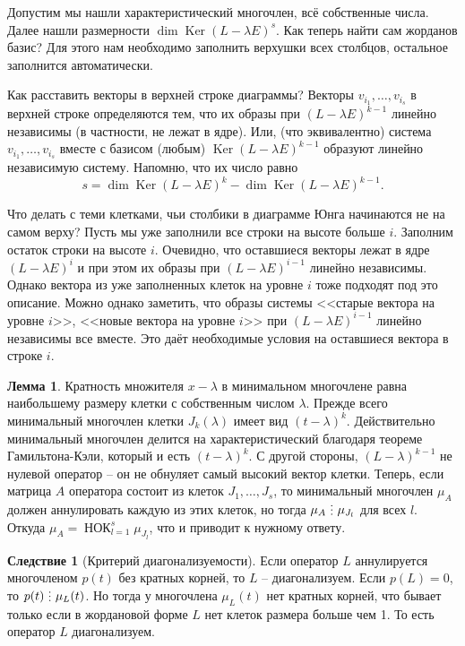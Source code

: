 \documentclass[10pt,a4paper,oneside]{book}
\theoremstyle{definition}
\newtheorem{lem}{Лемма}
\newtheorem{cor}{Следствие}
\DeclareMathOperator{\Ker}{Ker}
\newcommand{\di}{\mathop{\,\scalebox{0.85}{\raisebox{-1.2pt}[0.5\height]{\vdots}}\,}}
\newcommand{\Nok}{\operatorname{\text{НОК}}}
\def\lm{\begin{lem}}
\def\elm{\end{lem}}
\def\crl{\begin{cor}}
\def\ecrl{\end{cor}}
\begin{document}
\endproof








Допустим мы нашли характеристический многочлен, всё собственные числа. Далее нашли размерности $\dim \Ker(L-\lambda E)^s$. Как теперь найти сам жорданов базис? Для этого нам необходимо заполнить верхушки всех столбцов, остальное заполнится автоматически.



Как расставить векторы в верхней строке диаграммы? Векторы $v_{i_1}, \dots, v_{i_s}$  в верхней строке определяются тем, что их образы при $(L-\lambda E)^{k-1}$ линейно независимы (в частности, не лежат в ядре). Или, (что эквивалентно) система $v_{i_1}, \dots, v_{i_s}$ вместе с базисом (любым) $\Ker (L-\lambda E)^{k-1}$ образуют линейно независимую систему. Напомню, что их число равно
$$s=\dim \Ker (L-\lambda E)^k - \dim \Ker (L-\lambda E)^{k-1}.$$



Что делать с теми клетками, чьи столбики в диаграмме Юнга начинаются не на самом верху? Пусть мы уже заполнили все строки на высоте больше $i$. Заполним остаток строки на высоте $i$.  Очевидно, что оставшиеся векторы лежат в ядре $(L-\lambda E)^{i}$ и при этом их образы при $(L-\lambda E)^{i-1}$ линейно независимы. Однако вектора из уже заполненных клеток на уровне $i$ тоже подходят под это описание. Можно однако заметить, что образы системы <<старые вектора на уровне $i$>>, <<новые вектора на уровне $i$>> при $(L-\lambda E)^{i-1}$ линейно независимы все вместе. Это даёт необходимые условия на оставшиеся вектора в строке $i$.


\lm
Кратность множителя $x-\lambda$ в минимальном многочлене равна наибольшему размеру клетки с собственным числом $\lambda$.
\proof Прежде всего минимальный многочлен клетки $J_k(\lambda)$ имеет вид $(t-\lambda)^k$. Действительно минимальный многочлен делится на характеристический благодаря теореме Гамильтона-Кэли, который и есть $(t-\lambda)^k$. С другой стороны, $(L-\lambda)^{k-1}$ не нулевой оператор -- он не обнуляет самый высокий вектор клетки.
Теперь, если матрица $A$ оператора состоит из клеток $J_1,\dots, J_s$, то минимальный многочлен $\mu_A$ должен аннулировать каждую из этих клеток, но тогда $\mu_A \di \mu_{J_l}$ для всех $l$. Откуда $\mu_A= \Nok_{l=1}^s \mu_{J_l}$, что и приводит к нужному ответу.
\endproof
\elm

\crl[Критерий диагонализуемости] Если оператор $L$ аннулируется многочленом $p(t)$ без кратных корней, то $L$ -- диагонализуем.
\proof Если $p(L)=0$, то $p(t)\di \mu_L(t)$. Но тогда у многочлена $\mu_L(t)$ нет кратных корней, что бывает только если в жордановой форме $L$ нет клеток размера больше чем 1. То есть оператор $L$ диагонализуем. 
\endproof
\ecrl
\end{document}
